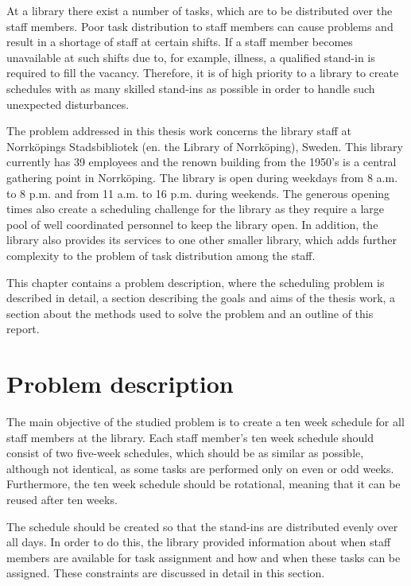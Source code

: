 
At a library there exist a number of tasks, which are to be distributed over the staff members. Poor task distribution to staff members can cause problems and result in a shortage of staff at certain shifts. If a staff member becomes unavailable at such shifts due to, for example, illness, a qualified stand-in is required to fill the vacancy. Therefore, it is of high priority to a library to create schedules with as many skilled stand-ins as possible in order to handle such unexpected disturbances. 

The problem addressed in this thesis work concerns the library staff at Norrköpings Stadsbibliotek (en. the Library of Norrköping), Sweden. This library currently has 39 employees and the renown building from the 1950's is a central gathering point in Norrköping. The library is open during weekdays from 8 a.m. to 8 p.m. and from 11 a.m. to 16 p.m. during weekends. The generous opening times also create a scheduling challenge for the library as they require a large pool of well coordinated personnel to keep the library open. In addition, the library also provides its services to one other smaller library, which adds further complexity to the problem of task distribution among the staff.

This chapter contains a problem description, where the scheduling problem is described in detail, a section describing the goals and aims of the thesis work, a section about the methods used to solve the problem and an outline of this report.

\section{Problem description} \label{problem_description}

The main objective of the studied problem is to create a ten week schedule for all staff members at the library. Each staff member's ten week schedule should consist of two five-week schedules, which should be as similar as possible, although not identical, as some tasks are performed only on even or odd weeks. Furthermore, the ten week schedule should be rotational, meaning that it can be reused after ten weeks.

The schedule should be created so that the stand-ins are distributed evenly over all days. In order to do this, the library provided information about when staff members are available for task assignment and how and when these tasks can be assigned. These constraints are discussed in detail in this section.

